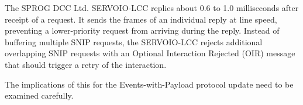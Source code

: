 \documentclass[11pt]{article}
\begin{document}
\cbstart
The SPROG DCC Ltd. SERVOIO-LCC replies about 0.6 to 1.0 milliseconds after receipt of a 
request.  
It sends the frames of an individual reply
at line speed, preventing a lower-priority request from arriving during the reply.
\cbend
Instead of buffering multiple SNIP requests, the SERVOIO-LCC rejects additional
overlapping SNIP requests with an 
Optional Interaction Rejected (OIR) message that 
should trigger a retry of the interaction.


The implications of this for the Events-with-Payload protocol update need to be 
examined carefully.
\end{document}
